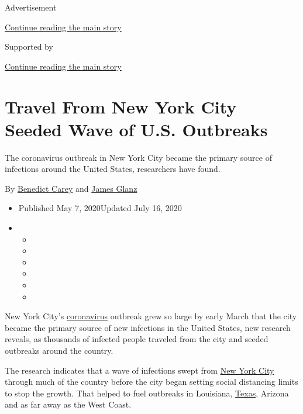Advertisement

\protect\hyperlink{after-top}{Continue reading the main story}

Supported by

\protect\hyperlink{after-sponsor}{Continue reading the main story}

\hypertarget{travel-from-new-york-city-seeded-wave-of-us-outbreaks}{%
\section{Travel From New York City Seeded Wave of U.S.
Outbreaks}\label{travel-from-new-york-city-seeded-wave-of-us-outbreaks}}

The coronavirus outbreak in New York City became the primary source of
infections around the United States, researchers have found.

By \href{https://www.nytimes.com/by/benedict-carey}{Benedict Carey} and
\href{https://www.nytimes.com/by/james-glanz}{James Glanz}

\begin{itemize}
\item
  Published May 7, 2020Updated July 16, 2020
\item
  \begin{itemize}
  \item
  \item
  \item
  \item
  \item
  \item
  \end{itemize}
\end{itemize}

New York City's
\href{https://www.nytimes.com/2020/07/16/travel/virus-vacation.html}{coronavirus}
outbreak grew so large by early March that the city became the primary
source of new infections in the United States, new research reveals, as
thousands of infected people traveled from the city and seeded outbreaks
around the country.

The research indicates that a wave of infections swept from
\href{https://www.nytimes.com/2020/07/14/nyregion/coronavirus-ny-travel-cuomo.html}{New
York City} through much of the country before the city began setting
social distancing limits to stop the growth. That helped to fuel
outbreaks in Louisiana,
\href{https://www.nytimes.com/2020/07/14/nyregion/coronavirus-ny-travel-cuomo.html}{Texas},
Arizona and as far away as the West Coast.

